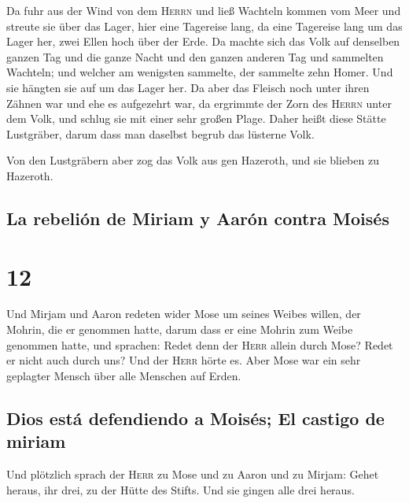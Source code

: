  Da fuhr aus der Wind von dem \textsc{Herrn} und ließ
Wachteln kommen vom Meer und streute sie über das Lager, hier eine
Tagereise lang, da eine Tagereise lang um das Lager her, zwei Ellen hoch
über der Erde.  Da machte sich das Volk auf denselben
ganzen Tag und die ganze Nacht und den ganzen anderen Tag und sammelten
Wachteln; und welcher am wenigsten sammelte, der sammelte zehn Homer.
Und sie hängten sie auf um das Lager her.  Da aber das
Fleisch noch unter ihren Zähnen war und ehe es aufgezehrt war, da
ergrimmte der Zorn des \textsc{Herrn} unter dem Volk, und schlug sie mit
einer sehr großen Plage.  Daher heißt diese Stätte
Lustgräber, darum dass man daselbst begrub das lüsterne Volk.

 Von den Lustgräbern aber zog das Volk aus gen Hazeroth,
und sie blieben zu Hazeroth.

\hypertarget{la-rebeliuxf3n-de-miriam-y-aaruxf3n-contra-moisuxe9s}{%
\subsection{La rebelión de Miriam y Aarón contra
Moisés}\label{la-rebeliuxf3n-de-miriam-y-aaruxf3n-contra-moisuxe9s}}

\hypertarget{section-11}{%
\section{12}\label{section-11}}

 Und Mirjam und Aaron redeten wider Mose um seines Weibes
willen, der Mohrin, die er genommen hatte, darum dass er eine Mohrin zum
Weibe genommen hatte,  und sprachen: Redet denn der
\textsc{Herr} allein durch Mose? Redet er nicht auch durch uns? Und der
\textsc{Herr} hörte es.  Aber Mose war ein sehr geplagter
Mensch über alle Menschen auf Erden.

\hypertarget{dios-estuxe1-defendiendo-a-moisuxe9s-el-castigo-de-miriam}{%
\subsection{Dios está defendiendo a Moisés; El castigo de
miriam}\label{dios-estuxe1-defendiendo-a-moisuxe9s-el-castigo-de-miriam}}

 Und plötzlich sprach der \textsc{Herr} zu Mose und zu
Aaron und zu Mirjam: Gehet heraus, ihr drei, zu der Hütte des Stifts.
Und sie gingen alle drei heraus.

